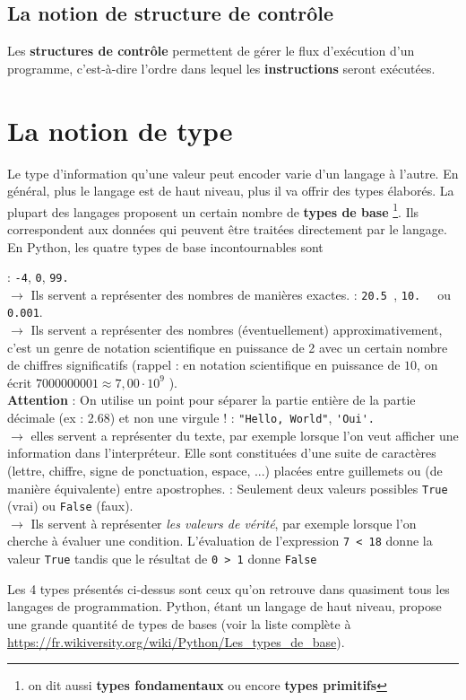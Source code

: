 \documentclass[11pt, a4paper]{book}
\begin{document}
\subsection{La notion de structure de contrôle}
Les \textbf{structures de contrôle} permettent de gérer le flux d'exécution d'un programme, c'est-à-dire l'ordre dans lequel les \textbf{instructions} seront exécutées. 


\section{La notion de type}
Le type d'information qu'une valeur peut encoder varie d'un langage à l'autre. En général, plus le langage est de haut niveau, plus il va offrir des types élaborés. La plupart des langages proposent un certain nombre de \textbf{types de base} \footnote{on dit aussi \textbf{types fondamentaux} ou encore \textbf{types primitifs}}. Ils correspondent aux données qui peuvent être traitées directement par le langage. En Python, les quatre types de base incontournables sont
\begin{enumerate}
	:  \lstinline{-4}, \lstinline{0}, \lstinline{99.}\\
	$ \longrightarrow$ Ils servent a représenter des nombres de manières exactes.
	 : \lstinline{20.5 },  \lstinline{10.  } ou \lstinline{ 0.001}.\\
	$ \longrightarrow$ Ils servent a représenter des nombres (éventuellement) approximativement, c’est un genre de notation scientifique en puissance de 2 avec un certain nombre de chiffres significatifs (rappel : en notation scientifique en puissance de $10$, on écrit $7000000001 \approx 7,00 \cdot 10^9$ ).\\
	\textbf{Attention} : On utilise un point pour séparer la partie entière de la partie décimale (ex : 2.68) et non une virgule !
	: \lstinline{"Hello, World"}, \lstinline{'Oui'.}\\
	$ \longrightarrow$ elles servent a représenter du texte, par exemple lorsque l’on veut afficher une information dans l’interpréteur. Elle sont constituées d'une suite de caractères
	(lettre, chiffre, signe de ponctuation, espace, ...) placées entre guillemets ou (de manière équivalente) entre apostrophes.
	: Seulement deux valeurs possibles \lstinline{True} (vrai) ou \lstinline{False} (faux).\\
	$ \longrightarrow$ Ils servent à représenter \textit{les valeurs de vérité}, par exemple lorsque l'on cherche à évaluer une condition. L'évaluation de l'expression \lstinline{7 < 18} donne la valeur \lstinline{True} tandis que le résultat de \lstinline{0 > 1} donne \lstinline{False}
\end{enumerate}
Les 4 types présentés ci-dessus sont ceux qu'on retrouve dans quasiment tous les langages de programmation. Python, étant un langage de haut niveau, propose une grande quantité de types de bases (voir la liste complète à \url{https://fr.wikiversity.org/wiki/Python/Les_types_de_base}).
\end{document}
